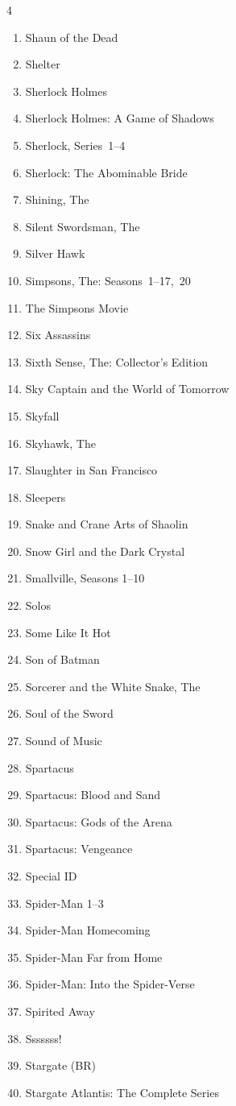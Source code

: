 \documentclass{article}
\begin{document}
\begin{multicols}{4}
\begin{enumerate}
\item Shaun of the Dead
\item Shelter
\item Sherlock Holmes
\item Sherlock Holmes: A Game of Shadows
\item Sherlock, Series~1--4
\item Sherlock: The Abominable Bride
\item Shining, The
\item Silent Swordsman, The
\item Silver Hawk
\item Simpsons, The: Seasons~1--17,~20
\item The Simpsons Movie
\item Six Assassins
\item Sixth Sense, The: Collector's Edition
\item Sky Captain and the World of Tomorrow
\item Skyfall
\item Skyhawk, The
\item Slaughter in San Francisco
\item Sleepers
\item Snake and Crane Arts of Shaolin
\item Snow Girl and the Dark Crystal
\item Smallville, Seasons 1--10
\item Solos
\item Some Like It Hot
\item Son of Batman
\item Sorcerer and the White Snake, The
\item Soul of the Sword
\item Sound of Music
\item Spartacus
\item Spartacus: Blood and Sand
\item Spartacus: Gods of the Arena
\item Spartacus: Vengeance
\item Special ID
\item Spider-Man 1--3
\item Spider-Man Homecoming
\item Spider-Man Far from Home
\item Spider-Man: Into the Spider-Verse
\item Spirited Away
\item Sssssss!
\item Stargate (BR)
\item Stargate Atlantis: The Complete Series

\end{enumerate}
\end{multicols}
\end{document}
